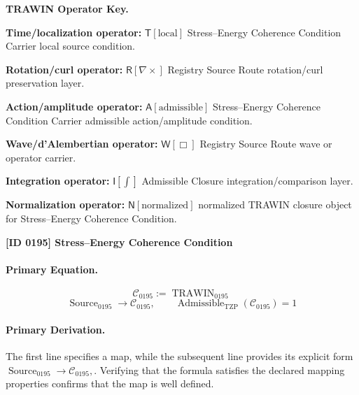 \par\vspace{0.45\baselineskip}
\noindent\begin{minipage}[t]{\linewidth}
\begingroup
\small
\raggedright
\textbf{TRAWIN Operator Key.}\par
\noindent\textbf{Time/localization operator:} $\mathsf{T}\!\left[\mathrm{local}\right]$ Stress--Energy Coherence Condition Carrier local source condition.\par
\noindent\textbf{Rotation/curl operator:} $\mathsf{R}\!\left[\nabla\times\right]$ Registry Source Route rotation/curl preservation layer.\par
\noindent\textbf{Action/amplitude operator:} $\mathsf{A}\!\left[\mathrm{admissible}\right]$ Stress--Energy Coherence Condition Carrier admissible action/amplitude condition.\par
\noindent\textbf{Wave/d'Alembertian operator:} $\mathsf{W}\!\left[\Box\right]$ Registry Source Route wave or operator carrier.\par
\noindent\textbf{Integration operator:} $\mathsf{I}\!\left[\int\right]$ Admissible Closure integration/comparison layer.\par
\noindent\textbf{Normalization operator:} $\mathsf{N}\!\left[\mathrm{normalized}\right]$ normalized TRAWIN closure object for Stress--Energy Coherence Condition.\par
\endgroup
\end{minipage}

\clearpage
\noindent\textbf{[ID 0195] Stress--Energy Coherence Condition}\par
\vspace{0.35em}
\paragraph{Primary Equation.}
\[
\mathcal{C}_{0195} := \operatorname{TRAWIN}_{0195}
\]
\[
\operatorname{Source}_{0195}\longrightarrow \mathcal{C}_{0195},
\qquad
\operatorname{Admissible}_{\mathrm{TZP}}\!\left(\mathcal{C}_{0195}\right)=1
\]

\paragraph{Primary Derivation.}
The first line specifies a map, while the subsequent line provides its explicit form \( \operatorname{Source}_{0195}\longrightarrow \mathcal{C}_{0195}, \). Verifying that the formula satisfies the declared mapping properties confirms that the map is well defined.
